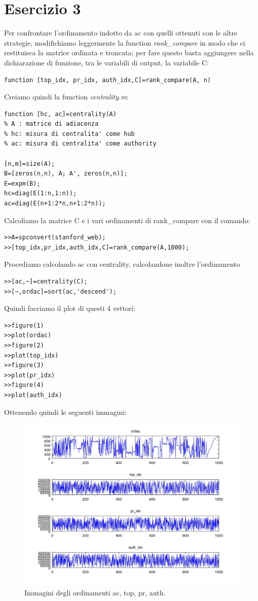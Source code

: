 \documentclass[11pt,a4paper,twoside,openright,titlepage,
                           headinclude,footinclude,BCOR5mm,
                           numbers=noenddot,cleardoublepage=empty,
                           tablecaptionabove]{scrbook}
\begin{document}
\section{Esercizio 3}
Per confrontare l'ordinamento indotto da ac con quelli ottenuti con le altre strategie, modifichiamo leggermente la function \emph{rank\_compare} in modo che ci restituisca la matrice ordinata e troncata; per fare questo basta aggiungere nella dichiarazione di funzione, tra le variabili di output, la variabile C:
\begin{lstlisting}[frame=trbl]
function [top_idx, pr_idx, auth_idx,C]=rank_compare(A, n)
\end{lstlisting}
Creiamo quindi la function \emph{centrality.m}:
\begin{lstlisting}[frame = trBL]
function [hc, ac]=centrality(A)
% A : matrice di adiacenza
% hc: misura di centralita' come hub
% ac: misura di centralita' come authority

[n,m]=size(A);
B=[zeros(n,n), A; A', zeros(n,n)];
E=expm(B);
hc=diag(E(1:n,1:n));
ac=diag(E(n+1:2*n,n+1:2*n));
\end{lstlisting}
Calcoliamo la matrice C e i vari ordinamenti di rank\_compare con il comando:
\begin{lstlisting}[frame=lines]
>>A=spconvert(stanford_web);
>>[top_idx,pr_idx,auth_idx,C]=rank_compare(A,1000);
\end{lstlisting}
Procediamo calcolando ac con centrality, calcolandone inoltre l'ordinamento
\begin{lstlisting}[frame=lines]
>>[ac,~]=centrality(C);
>>[~,ordac]=sort(ac,'descend');
\end{lstlisting}
Quindi facciamo il plot di questi 4 vettori:
\begin{lstlisting}[frame=lines]
>>figure(1)
>>plot(ordac)
>>figure(2)
>>plot(top_idx)
>>figure(3)
>>plot(pr_idx)
>>figure(4)
>>plot(auth_idx)
\end{lstlisting}
Ottenendo quindi le seguenti immagini:
\begin{figure}[h!]
\centering
\includegraphics[width=\textwidth]{figs/rank_compare.jpg}
\caption{Immagini degli ordinamenti ac, top, pr, auth.}
\end{figure}
\end{document}
